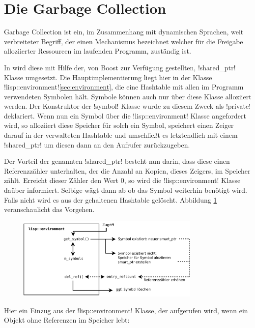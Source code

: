 \section{Die Garbage Collection}
\label{sec:shared_ptr}

Garbage Collection ist ein, im Zusammenhang mit dynamischen Sprachen,
weit verbreiteter Begriff, der
einen Mechanismus bezeichnet welcher für die Freigabe alloziierter
Ressourcen im laufenden Programm, zuständig
ist.

In \projectname{} wird diese mit Hilfe der, von Boost zur Verfügung
gestellten, !shared_ptr! Klasse umgesetzt.
Die Hauptimplementierung liegt hier in der Klasse !lisp::environment!\ref{sec:environment},
die eine Hashtable mit allen
im Programm verwendeten Symbolen hält.
Symbole können auch nur über diese Klasse alloziiert werden.
Der Konstruktor der !symbol! Klasse wurde zu diesem Zweck als !private! deklariert.
Wenn nun ein Symbol über die !lisp::environment! Klasse angefordert wird,
so alloziiert diese Speicher für solch ein Symbol,
speichert einen Zeiger darauf in der verwalteten Hashtable
und umschließt es letztendlich mit einem !shared_ptr!
um diesen dann an den Aufrufer zurückzugeben.

Der Vorteil der genannten !shared_ptr! besteht nun darin,
dass diese einen Referenzzähler unterhalten,
der die Anzahl an Kopien, dieses Zeigers, im Speicher zählt.
Erreicht dieser Zähler den Wert 0, so
wird die !lisp::environment! Klasse daüber informiert.
Selbige wägt dann ab ob das Symbol weiterhin benötigt
wird. Falls nicht wird es aus der gehaltenen Hashtable gelöscht.
Abbildung \ref{fig:garbage} veranschaulicht das Vorgehen.

\begin{figure}[htbp]
\centering
{}
\includegraphics[width=0.8\textwidth]{images/garbage.pdf}
\label{fig:garbage}
\end{figure}

Hier ein Einzug aus der !lisp::environment! Klasse, der aufgerufen wird, wenn
ein Objekt ohne Referenzen im Speicher lebt:


